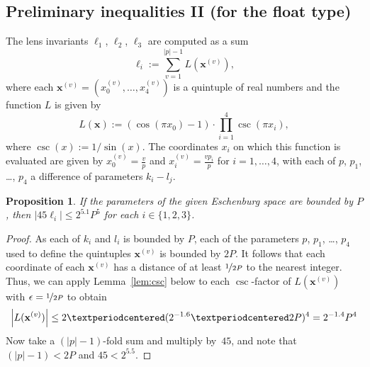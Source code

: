 \documentclass{article}
\newtheorem{prop}{Proposition}
\newcommand{\abs}[1]{\left|#1\right|}
\renewcommand{\vec}[1]{\mathbf{#1}}
\begin{document}
\subsection*{Preliminary inequalities II (for the float type)}
The lens invariants \(\ell_1\), \(\ell_2\), \(\ell_3\) are computed as a sum
\begin{equation}\label{eq:ell}
  \ell_i := \sum_{v=1}^{\abs{p}-1} L(\vec x^{(v)}),
\end{equation}
where each \(\vec x^{(v)}=(x_0^{(v)},\dots,x_4^{(v)})\) is a quintuple of real numbers and the function \(L\) is given by
\begin{equation}\label{eq:L}
  L(\vec x) 
  := (\cos(\pi x_0)-1)
  · \textstyle\prod_{i=1}^{4} \csc(\pi x_i),
\end{equation}
where \(\csc(x) := 1/\sin(x)\).
The coordinates \(x_i\) on which this function is evaluated are given by \(x_0^{(v)} = \frac{v}{p}\) and \(x_i^{(v)} = \frac{vp_i}{p}\) for \(i=1,\dots, 4\), with each of \(p\), \(p_1\), \dots, \(p_4\) a difference of parameters \(k_i-l_j\).  

\begin{prop}\label{prop:45ell}
  If the parameters of the given Eschenburg space are bounded by \(P\), then \(\abs{45\ell_i} \leq 2^{5.1} P^5\) for each \(i\in\{1,2,3\}\).
\end{prop}
\begin{proof}
  As each of \(k_i\) and \(l_i\) is bounded by \(P\), each of the parameters \(p\), \(p_1\), \dots, \(p_4\) used to define the quintuples \(\vec x^{(v)}\) is bounded by \(2P\).  It follows that each coordinate of each \(\vec x^{(v)}\) has a distance of at least \(\nicefrac{1}{2P}\) to the nearest integer.  Thus, we can apply Lemma~\ref{lem:csc} below to each \(\csc\)-factor of \(L(\vec x^{(v)})\) with \(\epsilon = \nicefrac{1}{2P}\) to obtain 
  \[
    \abs{L(\vec x^{(v)})}
    \leq 2·(2^{-1.6}·2P)^4 = 2^{-1.4}P^4\\
  \]
  Now take a \((\abs{p}-1)\)-fold sum and multiply by~\(45\), and note that \((\abs{p}-1) < 2P\) and  \(45 < 2^{5.5}\).
\end{proof}
\end{document}
